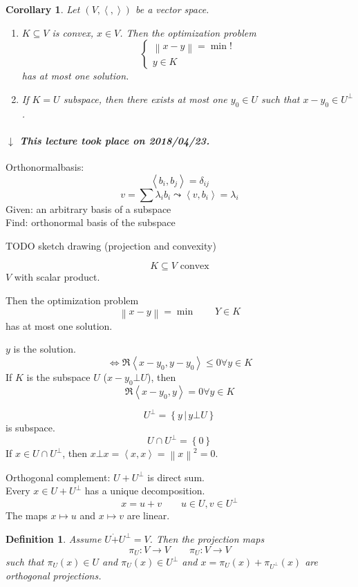 \documentclass{article}
\newtheorem{definition}{Definition}  \numberwithin{definition}{section}
\newtheorem{corollary}{Corollary}  \numberwithin{corollary}{section}
\newcommand{\set}[1]{\left\{#1\right\}}
\newcommand{\setdef}[2]{\left\{\left.#1\,\right|\,#2\right\}}
\newcommand{\ip}[2]{\left\langle#1,#2\right\rangle} %
\newcommand{\angel}[1]{\left\langle#1\right\rangle}
\newcommand{\norm}[1]{\left\|#1\right\|}
\newcommand{\dateref}[1]{%
  \begin{mdframed}[backgroundcolor=gray!10,innerbottommargin=0pt,innertopmargin=0pt]
    \paragraph{\textit{$\downarrow$ This lecture took place on #1.}}%
  \end{mdframed}%
}
\begin{document}
\begin{corollary}
  Let $(V, \angel{,})$ be a vector space.
  \begin{enumerate}
    \item $K \subseteq V$ is convex, $x \in V$.
      Then the optimization problem
      \[
        \left\{\begin{array}{c}
          \norm{x - y} = \min! \\
          y \in K
        \end{array}\right.
      \]
      has at most one solution.
    \item If $K = U$ subspace,
      then there exists at most one $y_0 \in U$ such that $x - y_0 \in U^\bot$.
  \end{enumerate}
\end{corollary}

\dateref{2018/04/23}

Orthonormalbasis:
\[ \ip{b_i}{b_j} = \delta_{ij} \]
\[ v = \sum \lambda_i b_i \leadsto \ip{v}{b_i} = \lambda_i \]
Given: an arbitrary basis of a subspace \\
Find: orthonormal basis of the subspace

TODO sketch drawing (projection and convexity)

\[ K \subseteq V \text{ convex} \]
$V$ with scalar product.

Then the optimization problem
\[ \norm{x - y} = \min \qquad Y \in K \]
has at most one solution.

$y$ is the solution.
\[ \iff \Re\ip{x-y_0}{y - y_0} \leq 0 \forall y \in K \]
If $K$ is the subspace $U$ ($x - y_0 \bot U$), then
\[ \Re\ip{x - y_0}{y} = 0 \forall y \in K \]

\[ U^\bot = \setdef{y}{y \bot U} \]
is subspace.
\[ U \cap U^\bot = \set{0} \]
If $x \in U \cap U^\bot$, then $x \bot x = \ip{x}{x} = \norm{x}^2 = 0$.

Orthogonal complement: $U + U^\bot$ is direct sum. \\
Every $x \in U + U^\bot$ has a unique decomposition.
\[ x = u + v \qquad u \in U, v \in U^\bot \]
The maps $x \mapsto u$ and $x \mapsto v$ are linear.

\begin{definition}
  Assume $U \dot+ U^\bot = V$.
  Then the projection maps
  \[ \pi_U: V \to V \qquad \pi_U: V \to V \]  %
  such that $\pi_U(x) \in U$ and $\pi_U(x) \in U^\bot$ and $x = \pi_U(x) + \pi_{U^\bot}(x)$ are orthogonal projections.
\end{definition}
\end{document}
